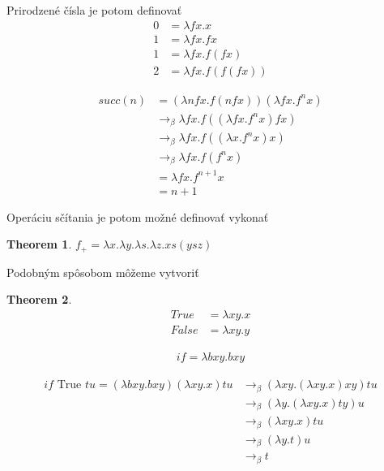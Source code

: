 \documentclass[a4paper,10pt,oneside]{report}%
\newtheorem{theorem}{Theorem}
\begin{document}
Prirodzené čísla je potom definovať
\begin{align*}
    0 &= \lambda f x . x \\
    1 &= \lambda f x . f x \\
    1 &= \lambda f x . f (f x) \\
    2 &= \lambda f x . f ( f (f x))
\end{align*}

\begin{align*}
    succ(n) &=           (\lambda n f x .  f( n f x ))(\lambda f x . f^{n} x) \\
           &\to_{\beta} \lambda f x . f (( \lambda f x . f^{n} x ) f x)      \\
           &\to_{\beta} \lambda f x . f (( \lambda x . f^{n} x) x)           \\
           &\to_{\beta} \lambda f x . f (f^{n} x)                            \\
           &=           \lambda f x . f^{n+1} x                              \\
           &= n + 1
\end{align*}

Operáciu sčítania je potom možné definovať vykonať
\begin{theorem}
    $f_{+} = \lambda x. \lambda y. \lambda s. \lambda z. x s (y s z)$
\end{theorem}

Podobným spôsobom môžeme vytvoriť 
\begin{theorem}
    \begin{align*}
        True &= \lambda x y . x \\
        False &= \lambda x y . y
    \end{align*}
\end{theorem}

\begin{align*}
    if = \lambda b x y . b x y
\end{align*}

\begin{align*}
    if \textrm{ True } t u = (\lambda bxy.bxy)(\lambda xy.x) tu & \to_{\beta} (\lambda xy.(\lambda xy.x)xy)tu \\
                                                     & \to_{\beta} (\lambda y.( \lambda xy.x)ty)u \\
                                                     & \to_{\beta} (\lambda xy.x)tu \\
                                                     & \to_{\beta} (\lambda y.t)u \\
                                                     & \to_{\beta} t
\end{align*}
\end{document}
